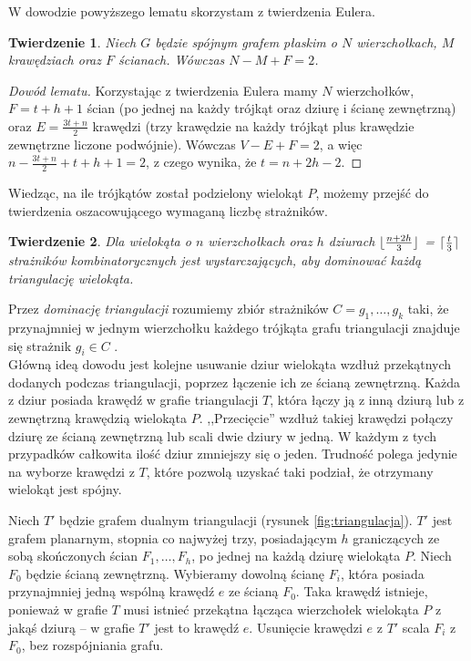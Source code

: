 \documentclass{xmgr}
\DeclarePairedDelimiter\ceil{\lceil}{\rceil}
\DeclarePairedDelimiter\floor{\lfloor}{\rfloor}
\newtheorem{Twierdzenie}{Twierdzenie}
\theoremstyle{definition}
\begin{document}
W dowodzie powyższego lematu skorzystam z twierdzenia Eulera.
\begin{Twierdzenie} \label{tw eulera} \cite{euler}
  Niech $G$ będzie spójnym grafem płaskim o $N$ wierzchołkach, $M$ krawędziach oraz $F$ ścianach. Wówczas $N-M + F = 2$.
\end{Twierdzenie}

\begin{proof}[Dowód lematu]
	Korzystając z twierdzenia Eulera mamy $N$ wierzchołków, $F = t + h + 1$ ścian (po jednej na każdy trójkąt oraz dziurę i ścianę zewnętrzną) oraz $E = \frac{3t+n}{2}$ krawędzi (trzy krawędzie na każdy trójkąt plus krawędzie zewnętrzne liczone podwójnie).  Wówczas $V-E + F = 2$, a więc $n-\frac{3t+n}{2} + t + h + 1 = 2$, z czego wynika, że $t = n + 2h-2$.
\end{proof}
Wiedząc, na ile trójkątów został podzielony wielokąt $P$, możemy przejść do twierdzenia oszacowującego wymaganą liczbę strażników.

\begin{Twierdzenie} \cite{orourke} \label{dominacjatriangulacji}
  Dla wielokąta o $n$ wierzchołkach oraz $h$ dziurach $\floor{\frac{n+2h}{3}}$ = $\ceil{\frac{t}{3}}$ strażników kombinatorycznych jest wystarczających, aby dominować każdą triangulację wielokąta.
\end{Twierdzenie}

Przez \emph{dominację triangulacji} rozumiemy zbiór strażników $C = {g_1,\ldots,g_k}$ taki, że przynajmniej w jednym wierzchołku każdego trójkąta grafu triangulacji znajduje się strażnik $g_i \in C$ \cite{orourke}. 
\\\indent Główną ideą dowodu jest kolejne usuwanie dziur wielokąta wzdłuż przekątnych dodanych podczas triangulacji, poprzez łączenie ich ze ścianą zewnętrzną. Każda z dziur posiada krawędź w grafie triangulacji $T$, która łączy ją z inną dziurą lub z zewnętrzną krawędzią wielokąta $P$. ,,Przecięcie'' wzdłuż takiej krawędzi połączy dziurę ze ścianą zewnętrzną lub scali dwie dziury w jedną. W każdym z tych przypadków całkowita ilość dziur zmniejszy się o jeden. Trudność polega jedynie na wyborze krawędzi z $T$, które pozwolą uzyskać taki podział, że otrzymany wielokąt jest spójny.

\indent Niech $T'$ będzie grafem dualnym triangulacji (rysunek \ref{fig:triangulacja}). $T'$ jest grafem planarnym, stopnia co najwyżej trzy, posiadającym $h$ graniczących ze sobą skończonych ścian $F_1, \ldots, F_h$, po jednej na każdą dziurę wielokąta $P$. Niech $F_0$ będzie ścianą zewnętrzną. Wybieramy dowolną ścianę $F_i$, która posiada przynajmniej jedną wspólną krawędź $e$ ze ścianą $F_0$. Taka krawędź istnieje, ponieważ w grafie $T$ musi istnieć przekątna łącząca wierzchołek wielokąta $P$ z jakąś dziurą -- w grafie $T'$ jest to krawędź $e$. Usunięcie krawędzi $e$ z $T'$ scala $F_i$ z $F_0$, bez rozspójniania grafu.
\end{document}
